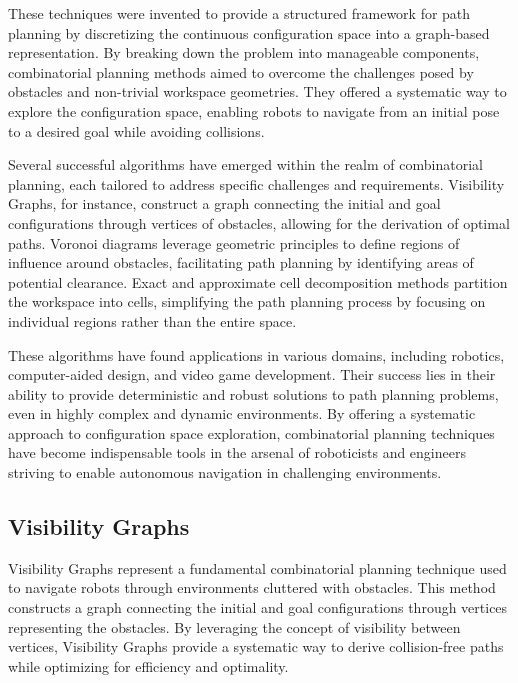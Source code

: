 \vspace*{6mm}


These techniques were invented to provide a structured framework for path planning by discretizing the continuous configuration space into a graph-based representation. By breaking down the problem into manageable components, combinatorial planning methods aimed to overcome the challenges posed by obstacles and non-trivial workspace geometries. They offered a systematic way to explore the configuration space, enabling robots to navigate from an initial pose to a desired goal while avoiding collisions.

\vspace*{6mm}


Several successful algorithms have emerged within the realm of combinatorial planning, each tailored to address specific challenges and requirements. Visibility Graphs, for instance, construct a graph connecting the initial and goal configurations through vertices of obstacles, allowing for the derivation of optimal paths. Voronoi diagrams leverage geometric principles to define regions of influence around obstacles, facilitating path planning by identifying areas of potential clearance. Exact and approximate cell decomposition methods partition the workspace into cells, simplifying the path planning process by focusing on individual regions rather than the entire space.

\vspace*{6mm}


These algorithms have found applications in various domains, including robotics, computer-aided design, and video game development. Their success lies in their ability to provide deterministic and robust solutions to path planning problems, even in highly complex and dynamic environments. By offering a systematic approach to configuration space exploration, combinatorial planning techniques have become indispensable tools in the arsenal of roboticists and engineers striving to enable autonomous navigation in challenging environments.

\subsection{Visibility Graphs}


Visibility Graphs represent a fundamental combinatorial planning technique used to navigate robots through environments cluttered with obstacles. This method constructs a graph connecting the initial and goal configurations through vertices representing the obstacles. By leveraging the concept of visibility between vertices, Visibility Graphs provide a systematic way to derive collision-free paths while optimizing for efficiency and optimality.

